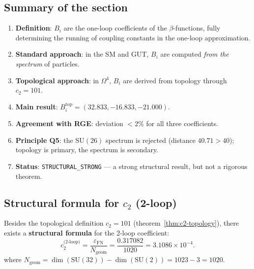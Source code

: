 \documentclass[11pt,a4paper]{article}
\newcommand{\SU}{\ensuremath{\mathrm{SU}}}
\newcommand{\Om}{\ensuremath{\Omega^4}}
\newcommand{\epsFN}{\ensuremath{\varepsilon_{\text{FN}}}}
\theoremstyle{definition}
\begin{document}
\subsection{Summary of the section}
\label{subsec:bi-summary}

\begin{enumerate}
    \item \textbf{Definition}: $B_i$ are the one-loop coefficients
          of the $\beta$-functions, fully determining the running of
          coupling constants in the one-loop approximation.
    \item \textbf{Standard approach}: in the SM and GUT, $B_i$ are computed
          \emph{from the spectrum} of particles.
    \item \textbf{Topological approach}: in $\Om$, $B_i$ are derived
          from topology through $c_2 = 101$.
    \item \textbf{Main result}:
          $B_i^{\text{top}} = (32.833, -16.833, -21.000)$.
    \item \textbf{Agreement with RGE}: deviation $< 2\%$
          for all three coefficients.
    \item \textbf{Principle Q5}: the $\SU(26)$ spectrum is rejected
          (distance $40.71 > 40$); topology is primary, the spectrum is secondary.
    \item \textbf{Status}: \texttt{STRUCTURAL\_STRONG} ---
          a strong structural result, but not a rigorous theorem.
\end{enumerate}
\subsection{Structural formula for \texorpdfstring{$c_2$}{c\_2} (2-loop)}
\label{subsec:c2-structural}

Besides the topological definition $c_2 = 101$ (theorem~\ref{thm:c2-topology}),
there exists a \textbf{structural formula} for the 2-loop coefficient:
\begin{equation}
    \boxed{
    c_2^{\text{(2-loop)}} = \frac{\epsFN}{N_{\text{geom}}}
    = \frac{0.317082}{1020} = 3.1086 \times 10^{-4}.
    }
    \label{eq:c2-structural}
\end{equation}
where $N_{\text{geom}} = \dim(\SU(32)) - \dim(\SU(2)) = 1023 - 3 = 1020$.
\end{document}
